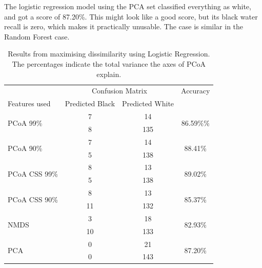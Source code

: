 The logistic regression model using the PCA set classified everything as white, and got a score of 87.20\%. This might look like a good score, but its black water recall is zero, which makes it practically unusable. The case is similar in the Random Forest case.
\begin{table}[h]
	\centering
	\begin{tabular}{l c  c c}
		\toprule
		&\multicolumn{2}{c}{Confusion Matrix} & Accuracy\\
		Features used & Predicted Black&Predicted White&\\
		\midrule
		\multirow{2}{*}{PCoA 99\%} &7 &14&\multirow{2}{*}{86.59\%\%}\\
		&	 8&135&\\
		\cmidrule{2-3}
		\multirow{2}{*}{PCoA 90\%} &7 &14&\multirow{2}{*}{88.41\%}\\
		&	 5&138&\\
		\cmidrule{2-3}
		\multirow{2}{*}{PCoA CSS 99\%} &8 &13&\multirow{2}{*}{89.02\%}\\
		&	 5&138&\\
		\cmidrule{2-3}
		\multirow{2}{*}{PCoA CSS 90\%} &8 &13&\multirow{2}{*}{85.37\%}\\
		&	11&132&\\
		\cmidrule{2-3}
		\multirow{2}{*}{NMDS}&3 &18&\multirow{2}{*}{82.93\%}\\
		&	 10&133&\\
						\cmidrule{2-3}
		\multirow{2}{*}{PCA}&0 &21&\multirow{2}{*}{87.20\%}\\
		&	 0&143&\\
		\bottomrule
	\end{tabular}
	\caption{Results from maximising dissimilarity using Logistic Regression. The percentages indicate the total variance the axes of PCoA explain.}
	\label{table:lrdissimilarityappendix}
\end{table}

